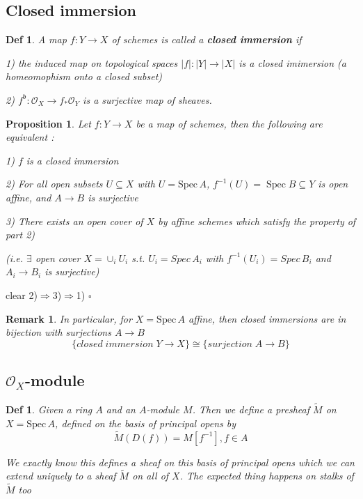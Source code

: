 \documentclass{article}
\newtheorem{definition}[theorem]{Def}
\newtheorem{proposition}[theorem]{Proposition}
\newtheorem{remark}[theorem]{Remark}
\newenvironment{Proof}{{\noindent \indent \it Proof:\quad}}{\hfill $\square$\par}
\begin{document}
\newpage
\subsection{Closed immersion}
\begin{definition}
    A map $f:Y\to X$ of schemes is called a \textbf{closed immersion} if
    
    1) the induced map on topological spaces $|f|:|Y|\to|X|$ is a closed imimersion (a homeomophism onto a closed subset) 
    
    2) $f^{\mathfrak b}:{\mathcal{O}}_{X}\to f_{\ast}{\mathcal{O}}_{Y}$ is a surjective map of sheaves.
\end{definition}
\begin{proposition}
    Let $f:Y\to X$ be a map of schemes, then the following are equivalent :
    
1)   $f$ is a closed immersion
    
2) For all open subsets $U\subseteq X$ with $U={\mathrm{Spec}}\,A$,  $f^{-1}(U)=\operatorname{Spec}B\subseteq Y$ is open affine, and $A\to B$ is surjective

3) There exists an open cover of $X$ by affine schemes which satisfy the property of part 2)

(i.e. $\exists$ open cover $X=\cup_i U_i$ s.t. $U_i=Spec\,A_i$ with $f^{-1}(U_i)=Spec\,B_i$ and $A_i\to B_i$ is surjective)
\end{proposition}

\begin{Proof}
    clear 2)$\Rightarrow$3)$\Rightarrow$1)
\end{Proof}

\begin{remark}
In particular, for $X={\mathrm{Spec}}\,A$ affine, then closed immersions are in bijection with surjections $A\to B$
$$
\{closed\; immersion\;Y\rightarrow X\}
\cong
\{surjection\; A\to B\}
$$
\end{remark}




\newpage
\subsection{$\mathcal O_X$-module}
\begin{definition}
    Given a ring $A$ and an $A$-module $M$. Then we define a presheaf $\widetilde{M}$ on $X={\mathrm{Spec}}\,A$, defined on the basis of principal opens by
$$
\widetilde{M}(D(f))=M[f^{-1}],f\in A 
$$

We exactly know this defines a sheaf on this basis of principal opens which we can extend uniquely to a sheaf $\widetilde{{M}}$ on all of $X$. The expected thing happens on stalks of $\widetilde{{M}}$ too
\end{definition}
\end{document}
